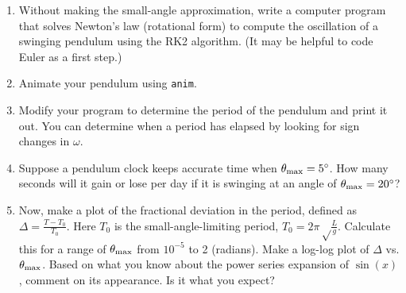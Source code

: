 \documentclass[12pt]{article}
\begin{document}
\begin{enumerate}
{\begin{enumerate}

\item{Without making the small-angle approximation, 
write a computer program that solves Newton's law (rotational form) to compute the oscillation of a swinging pendulum using the RK2 algorithm. (It may be helpful to code Euler as a first step.)}

\item{Animate your pendulum using {\tt anim}.}

\item{Modify your program to determine the period of the pendulum and print it out. You can determine when a period has elapsed by looking for sign changes in $\omega$.}

\item{Suppose a pendulum clock keeps accurate time when $\theta_{\rm max}=5^\circ$. How many seconds will it gain or lose per day if it is swinging at an angle of  $\theta_{\rm max}=20^\circ$?}

\item{Now, make a plot of the fractional deviation in the period, defined as $\Delta = \frac{T-T_0}{T_0}$. Here $T_0$ is the small-angle-limiting period, $T_0=2\pi\sqrt\frac{L}{g}$. Calculate this for a range of $\theta_{\rm max}$ from $10^{-5}$ to 2 (radians). Make a log-log plot of $\Delta$ vs. $\theta_{\rm max}$.
Based on what you know about the power series expansion of $\sin(x)$, comment on its appearance. Is it what you expect?}

\end{enumerate}


}

\end{enumerate}
\end{document}
